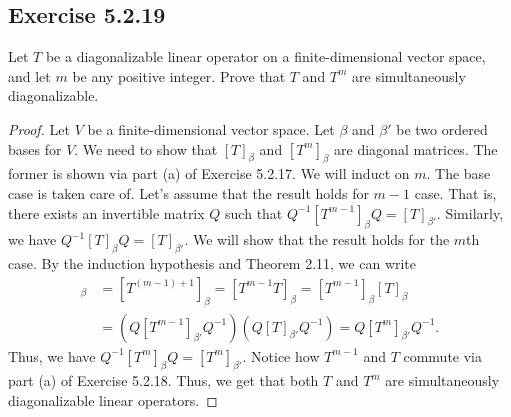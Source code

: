 \subsection*{Exercise 5.2.19} Let \( T  \) be a diagonalizable linear operator on a finite-dimensional vector space, and let \( m  \) be any positive integer. Prove that \( T  \) and \( T^{m} \) are simultaneously diagonalizable.
\begin{proof}
Let \( V \) be a finite-dimensional vector space. Let \( \beta \) and \( \beta'  \) be two ordered bases for \( V  \). We need to show that \( [T]_{\beta} \) and \(  [T^{m}]_{\beta}  \)  are diagonal matrices. The former is shown via part (a) of Exercise 5.2.17. We will induct on \(  m  \). The base case is taken care of. Let's assume that the result holds for \( m - 1  \) case. That is, there exists an invertible matrix \( Q  \) such that \( Q^{-1} [T^{m-1}]_{\beta} Q = [T]_{\beta'} \). Similarly, we have \( Q^{-1} [T]_{\beta} Q = [T]_{\beta'} \). We will show that the result holds for the \(m  \)th case. By the induction hypothesis and Theorem 2.11, we can write        
\begin{align*}
    [T^{m}]_{\beta} &= [T^{(m-1) + 1}]_{\beta} = [T^{m-1} T]_{\beta} = [T^{m-1}]_{\beta} [T]_{\beta} \\
                    &= (Q [T^{m-1}]_{\beta'} Q^{-1})(Q [T]_{\beta'}Q^{-1}) = Q [T^{m}]_{\beta'} Q^{-1}. 
\end{align*}
Thus, we have \( Q^{-1} [T^{m}]_{\beta} Q = [T^{m}]_{\beta'}  \). Notice how \( T^{m-1}  \) and \( T \) commute via part (a) of Exercise 5.2.18. Thus, we get that both \( T \) and \( T^{m} \) are simultaneously diagonalizable linear operators. 
\end{proof}

